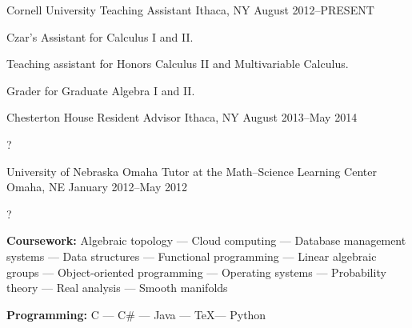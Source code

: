 \documentclass[11pt, letterpaper]{awesome-cv}
\begin{document}

\begin{cventries}

\cventry
	{Cornell University}
	{Teaching Assistant}
	{Ithaca, NY}
	{August 2012--PRESENT}
	{
		\begin{cvitems}
			\item{Czar's Assistant for Calculus I and II.}
			\item{Teaching assistant for Honors Calculus II and Multivariable Calculus.}
			\item{Grader for Graduate Algebra I and II.}
		\end{cvitems}
	}

\cventry
	{Chesterton House}
	{Resident Advisor}
	{Ithaca, NY}
	{August 2013--May 2014}
	{
		\begin{cvitems}
			\item{?}
		\end{cvitems}
	}

\cventry
	{University of Nebraska Omaha}
	{Tutor at the Math--Science Learning Center}
	{Omaha, NE}
	{January 2012--May 2012}
	{
		\begin{cvitems}
			\item{?}
		\end{cvitems}
	}
	
\end{cventries}





\begin{cvparagraph}

\textbf{Coursework:} Algebraic topology --- Cloud computing --- Database management systems --- Data structures --- Functional programming --- Linear algebraic groups --- Object-oriented programming --- Operating systems --- Probability theory --- Real analysis --- Smooth manifolds

\textbf{Programming:} C --- C\# --- Java --- \TeX --- Python
\end{cvparagraph}
\end{document}
